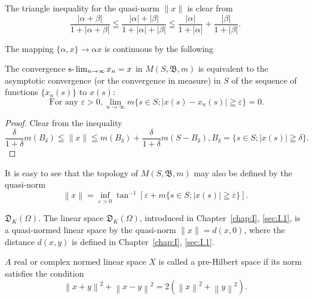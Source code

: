 The triangle inequality for the quasi-norm $\|x\|$ is clear from 
\[
\frac {| \alpha + \beta |}{1 + | \alpha + \beta |} \leqq \frac {| \alpha | + | \beta |}{1 + | \alpha | + | \beta |} \leqq \frac {| \alpha |}{1 + | \alpha |} + \frac {| \beta |}{1 + | \beta |}.
\]

The mapping $\{\alpha, x\} \to \alpha x$ is continuous by the following 

\begin{propositionu} The convergence $\text{s-}\lim\nolimits_{n \to \infty} x_n = x$ in $M(S, \mathfrak{B}, m)$ is equivalent to the asymptotic convergence (or the convergence in measure) in $S$ of the sequence of functions $\{x_n(s)\}$ to $x(s)$: 
\begin{equation}\label{eq:I.4.2}
\text{ For any } \varepsilon > 0, \lim\limits_{n \to \infty} m \{s \in S; | x (s)- x_{n} (s) | \geqq \varepsilon \} = 0.
\end{equation}
\end{propositionu}

\begin{proof}
 Clear from the inequality 
\[
\frac {\delta}{1 + \delta} m (B_{\delta}) \leqq \| x \| \leqq m (B_{\delta}) + \frac {\delta}{1 + \delta} m (S- B_{\delta}), B_{\delta} = \{s \in S; | x (s) | \geqq \delta \}. \]
\end{proof}

\begin{remarku} It is easy to see that the topology of $M(S, \mathfrak{B}, m)$ may also be defined by the quasi-norm 
\begin{equation}\tag{1'}\label{eq:I.4.1'}
\left\| x \right\| = \inf\limits_{\varepsilon > 0} \tan^{-1} [ \varepsilon + m \{s \in S; | x (s) | \geqq \varepsilon \} ].
\end{equation}
\end{remarku}

\begin{example}\label{ex:I.4.Example.3} $\mathfrak{D}_K(\Omega)$. The linear space $\mathfrak{D}_K(\Omega)$, introduced in Chapter~\ref{chap:I}, \ref{sec:I.1}, is a quasi-normed linear space by the quasi-norm $\|x\| = d(x,0)$, where the distance $d(x,y)$ is defined in Chapter~\ref{chap:I}, \ref{sec:I.1}. 
\end{example}


\label{sec:I.5}

\begin{definition}\label{def:I.5.Definition.1} $A$ real or complex normed linear space $X$ is called a pre-Hilbert space if its norm satisfies the condition 
\begin{equation}\label{eq:I.5.1}
\left\| x + y \right\| ^{2} + \left\| x- y \right\| ^{2} = 2 \left(\left\| x \right\| ^{2} + \left\| y \right\| ^{2}\right).
\end{equation}
\end{definition}

